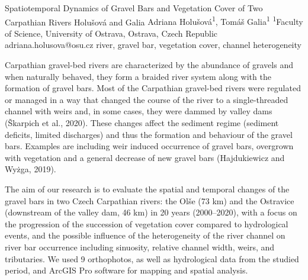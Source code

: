 \abstract
{Spatiotemporal Dynamics of Gravel Bars and Vegetation Cover of Two Carpathian Rivers} 
{Holušová and Galia} 
{Adriana Holušová\textsuperscript{1}, Tomáš Galia\textsuperscript{1}} 
{\TLtag} 
{
\textsuperscript{1}Faculty of Science, University of Ostrava, Ostrava, Czech Republic
}
{adriana.holusova@osu.cz}  %
{river, gravel bar, vegetation cover, channel heterogeneity}
{Carpathian gravel-bed rivers are characterized by the abundance of gravels and when naturally behaved, they form a braided river system along with the formation of gravel bars. Most of the Carpathian gravel-bed rivers were regulated or managed in a way that changed the course of the river to a single-threaded channel with weirs and, in some cases, they were dammed by valley dams (Škarpich et al., 2020). These changes affect the sediment regime (sediment deficits, limited discharges) and thus the formation and behaviour of the gravel bars. Examples are including weir induced occurrence of gravel bars, overgrown with vegetation and a general decrease of new gravel bars (Hajdukiewicz and Wyżga, 2019).

The aim of our research is to evaluate the spatial and temporal changes of the gravel bars in two Czech Carpathian rivers: the Olše (73 km) and the Ostravice (downstream of the valley dam, 46 km) in 20 years (2000–2020), with a focus on the progression of the succession of vegetation cover compared to hydrological events, and the possible influence of the heterogeneity of the river channel on river bar occurrence including sinuosity, relative channel width, weirs, and tributaries. We used 9 orthophotos, as well as hydrological data from the studied period, and ArcGIS Pro software for mapping and spatial analysis. 

}

